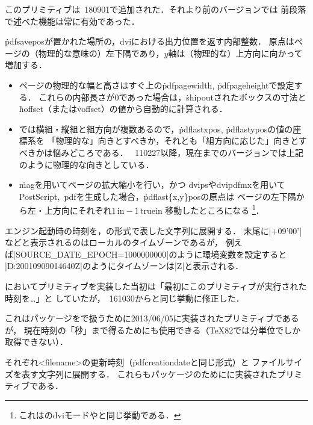 \documentclass[a4paper,11pt,nomag]{jsarticle}
\begin{document}
\begin{cslist}
  このプリミティブは\epTeX~180901で追加された．それより前のバージョンでは
  前段落で述べた機能は常に有効であった．

  \.{pdfsavepos}が置かれた場所の，dviにおける出力位置を返す内部整数．
  原点はページの（物理的な意味の）左下隅であり，$y$軸は（物理的な）上方向に向かって増加する．
 \begin{itemize}
  \item ページの物理的な幅と高さはすぐ上の\.{pdfpagewidth}, \.{pdfpageheight}で設定する．
    これらの内部長さが0であった場合は，\.{shipout}されたボックスの寸法と
    \.{hoffset}（または\.{voffset}）の値から自動的に計算される．
  \item \pTeX では横組・縦組と組方向が複数あるので，\.{pdflastxpos}, \.{pdflastypos}の値の座標系を
    「物理的な」向きとすべきか，それとも「組方向に応じた」向きとすべきかは悩みどころである．
    \epTeX~110227以降，現在までのバージョンでは上記のように物理的な向きとしている．
  \item \.{mag}を用いてページの拡大縮小を行い，かつ
    dvipsやdvipdfmxを用いてPostScript,~pdfを生成した場合，\.{pdflast\{x,y\}pos}の原点は
    ページの左下隅から左・上方向にそれぞれ$1\,\mathrm{in}-1\,\mathrm{truein}$%
    移動したところになる
    \footnote{これはのdviモードやと同じ挙動である．}．
 \end{itemize}

 \csitem[\.{pdfcreationdate}]
  エンジン起動時の時刻を，\texttt{\pdfcreationdate}の形式で表した文字列に展開する．
  末尾に|+09'00'|などと表示されるのはローカルのタイムゾーンであるが，
  例えば|SOURCE_DATE_EPOCH=1000000000|のように環境変数を設定すると
  |D:20010909014640Z|のようにタイムゾーンは|Z|と表示される．

  \epTeX においてプリミティブを実装した当初は「最初にこのプリミティブが実行された時刻を…」と
  していたが，\epTeX~161030からと同じ挙動に修正した．

  これはパッケージを\epTeX で扱うために2013/06/05に実装されたプリミティブであるが，
  現在時刻の「秒」まで得るためにも使用できる（\TeX 82では分単位でしか取得できない）．

  それぞれ<filename>の更新時刻（\.{pdfcreationdate}と同じ形式）と
  ファイルサイズを表す文字列に展開する．
  これらもパッケージのために\epTeX に実装されたプリミティブである．


\end{cslist}
\end{document}
